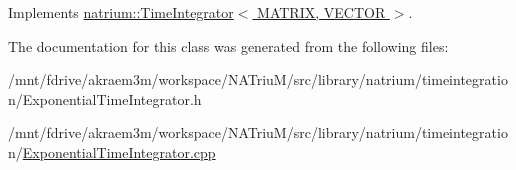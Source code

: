 Implements \hyperlink{classnatrium_1_1TimeIntegrator_a0237ebbaf737c7d3278777fb08007e99}{natrium::TimeIntegrator$<$ MATRIX, VECTOR $>$}.

The documentation for this class was generated from the following files:\begin{DoxyCompactItemize}
\item 
/mnt/fdrive/akraem3m/workspace/NATriuM/src/library/natrium/timeintegration/ExponentialTimeIntegrator.h\item 
/mnt/fdrive/akraem3m/workspace/NATriuM/src/library/natrium/timeintegration/\hyperlink{ExponentialTimeIntegrator_8cpp}{ExponentialTimeIntegrator.cpp}\end{DoxyCompactItemize}

